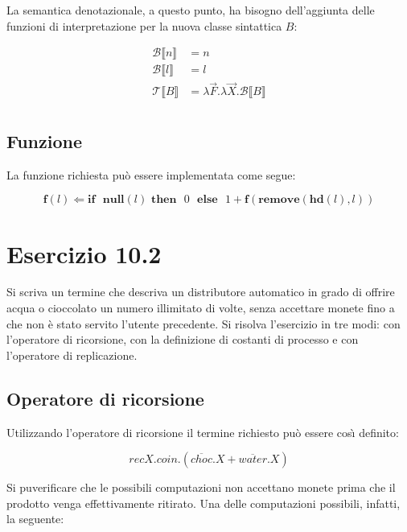 		La semantica denotazionale, a questo punto, ha bisogno dell'aggiunta delle funzioni di interpretazione per la nuova classe sintattica $B$:
		
		\begin{align*}
		\mathcal{B} \llbracket n \rrbracket & = n\\
		\mathcal{B} \llbracket l \rrbracket & = l\\
		\mathcal{T} \llbracket B \rrbracket & = \lambda \overrightarrow{F}.\lambda \overrightarrow{X}.\mathcal{B} \llbracket B \rrbracket\\		
		\end{align*}
		
		\subsection{Funzione}
		La funzione richiesta pu\`o essere implementata come segue:
		
		$$\textbf{f}(l) \Leftarrow \textbf{if}\text{ }\textbf{null}(l)\text{
		}\textbf{then}\text{ }0\text{ }\textbf{else}\text{ }1 +
		\textbf{f}(\textbf{remove}(\textbf{hd}(l),l))$$
		
		\newpage
		
	\section{Esercizio 10.2}
		Si scriva un termine che descriva un distributore automatico in grado
		di offrire acqua o cioccolato un numero illimitato di volte, senza accettare
		monete fino a che non \`e stato servito l'utente precedente. Si risolva
		l'esercizio in tre modi: con l'operatore di ricorsione, con la definizione di
		costanti di processo e con l'operatore di replicazione.
		
		\sectionline
		
		\subsection{Operatore di ricorsione}
		
		Utilizzando l'operatore di ricorsione il termine richiesto pu\`{o} essere cos\`{\i} definito:
		
		$$recX.coin.(\overline{choc}.X + \overline{water}.X)$$
		
		Si pu\oacc verificare che le possibili computazioni non accettano monete prima che il prodotto venga effettivamente ritirato. Una delle computazioni possibili, infatti, \eacc la seguente:
		
